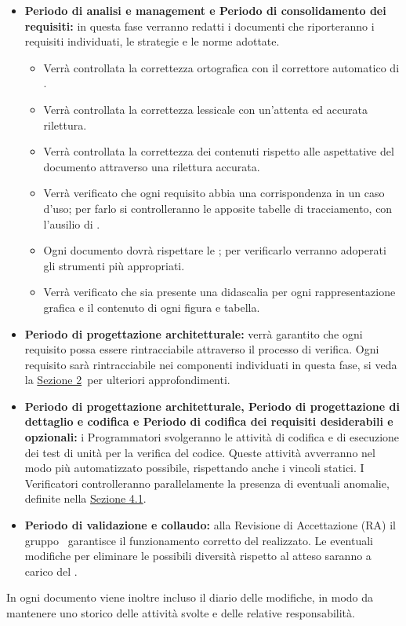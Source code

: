 		\begin{itemize}
			\item \textbf{Periodo di analisi e management e Periodo di consolidamento dei requisiti:} in questa fase verranno redatti i documenti che riporteranno i requisiti individuati, le strategie e le norme adottate.
			\begin{itemize}
				\item Verrà controllata la correttezza ortografica con il correttore automatico di .
				\item Verrà controllata la correttezza lessicale con un'attenta ed accurata rilettura.
				\item Verrà controllata la correttezza dei contenuti rispetto alle aspettative del documento attraverso una rilettura accurata.
				\item Verrà verificato che ogni requisito abbia una corrispondenza in un caso d'uso; per farlo si controlleranno le apposite tabelle di tracciamento, con l'ausilio di .
				\item Ogni documento dovrà rispettare le \NPdoc; per verificarlo verranno adoperati gli strumenti più appropriati.
				\item Verrà verificato che sia presente una didascalia per ogni rappresentazione grafica e il contenuto di ogni figura e tabella.
			\end{itemize}
			\item \textbf{Periodo di progettazione architetturale:} verrà garantito che ogni requisito possa essere rintracciabile attraverso il processo di verifica. Ogni requisito sarà rintracciabile nei componenti individuati in questa fase, si veda la \hyperref[sec:2]{Sezione 2}\ per ulteriori approfondimenti.
			\item \textbf{Periodo di progettazione architetturale, Periodo di progettazione di dettaglio e codifica e Periodo di codifica dei requisiti desiderabili e opzionali:} i Programmatori svolgeranno le attività di codifica e di esecuzione dei test di unità per la verifica del codice. Queste attività avverranno nel modo più automatizzato possibile, rispettando anche i vincoli statici. I Verificatori controlleranno parallelamente la presenza di eventuali anomalie, definite nella \hyperref[sec:4.1]{Sezione 4.1}.
			\item \textbf{Periodo di validazione e collaudo:} alla Revisione di Accettazione (RA) il gruppo \AUTORE\ garantisce il funzionamento corretto del  realizzato. Le eventuali modifiche per eliminare le possibili diversità rispetto al  atteso saranno a carico del .
		\end{itemize}
		In ogni documento viene inoltre incluso il diario delle modifiche, in modo da mantenere uno storico delle attività svolte e delle relative responsabilità.
